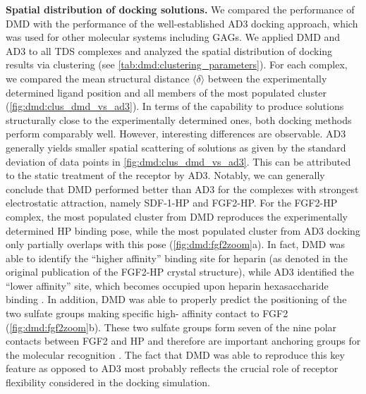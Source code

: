 \vspace{1cm}
\textbf{Spatial distribution of docking solutions.}
We compared the performance of DMD with the performance of the well-established
AD3 docking approach, which was used for other molecular systems including GAGs.
We applied DMD and AD3 to all TDS complexes and analyzed the spatial
distribution of docking results via clustering
(see \cref{tab:dmd:clustering_parameters}). For each
complex, we compared the mean structural distance $\langle \delta \rangle$
between the experimentally determined ligand position and all members of the
most populated cluster (\cref{fig:dmd:clus_dmd_vs_ad3}). In terms of the
capability to produce solutions structurally close to the experimentally
determined ones, both docking methods perform comparably well. However,
interesting differences are observable. AD3 generally yields smaller spatial
scattering of solutions as given by the standard deviation of data points in
\cref{fig:dmd:clus_dmd_vs_ad3}. This can be attributed to the static treatment
of the receptor by AD3. Notably, we can generally conclude that DMD performed
better than AD3 for the complexes with strongest electrostatic attraction,
namely SDF-1-HP and FGF2-HP. For the FGF2-HP complex, the most populated cluster
from DMD reproduces the experimentally determined HP binding pose, while the
most populated cluster from AD3 docking only partially overlaps with this pose
(\cref{fig:dmd:fgf2zoom}a). In fact, DMD was able to identify the
\enquote{higher affinity} binding site for heparin (as denoted in the original
publication of the FGF2-HP crystal structure), while AD3 identified the
\enquote{lower affinity} site, which becomes occupied upon heparin
hexasaccharide binding \cite{faham_heparin_1996}. In addition, DMD was able to
properly predict the positioning of the two sulfate groups making specific high-
affinity contact to FGF2 (\cref{fig:dmd:fgf2zoom}b). These two sulfate groups
form seven of the nine polar contacts between FGF2 and HP and therefore are
important anchoring groups for the molecular recognition
\cite{faham_heparin_1996}. The fact that DMD was able to reproduce this key
feature as opposed to AD3 most probably reflects the crucial role of receptor
flexibility considered in the docking simulation.

